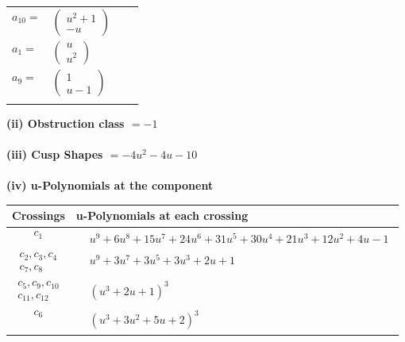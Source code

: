 \documentclass[1p]{elsarticle_modified}
\theoremstyle{definition}
\begin{document}
\begin{tabular}{m{7pt} m{180pt} m{7pt} m{180pt} }
\flushright $a_{10}=$&$\begin{pmatrix}u^2+1\\- u\end{pmatrix}$ \\
\flushright $a_{1}=$&$\begin{pmatrix}u\\u^2\end{pmatrix}$ \\
\flushright $a_{9}=$&$\begin{pmatrix}1\\u-1\end{pmatrix}$\\&\end{tabular}
\flushleft \textbf{(ii) Obstruction class $= -1$}\\~\\
\flushleft \textbf{(iii) Cusp Shapes $= -4 u^2-4 u-10$}\\~\\
\newpage\renewcommand{\arraystretch}{1}
\flushleft \textbf{(iv) u-Polynomials at the component}\newline \\
\begin{tabular}{m{50pt}|m{274pt}}
Crossings & \hspace{64pt}u-Polynomials at each crossing \\
\hline $$\begin{aligned}c_{1}\end{aligned}$$&$\begin{aligned}
&u^9+6 u^8+15 u^7+24 u^6+31 u^5+30 u^4+21 u^3+12 u^2+4 u-1
\end{aligned}$\\
\hline $$\begin{aligned}c_{2},c_{3},c_{4}\\c_{7},c_{8}\end{aligned}$$&$\begin{aligned}
&u^9+3 u^7+3 u^5+3 u^3+2 u+1
\end{aligned}$\\
\hline $$\begin{aligned}c_{5},c_{9},c_{10}\\c_{11},c_{12}\end{aligned}$$&$\begin{aligned}
&(u^3+2 u+1)^3
\end{aligned}$\\
\hline $$\begin{aligned}c_{6}\end{aligned}$$&$\begin{aligned}
&(u^3+3 u^2+5 u+2)^3
\end{aligned}$\\
\hline
\end{tabular}\\~\\
\end{document}
